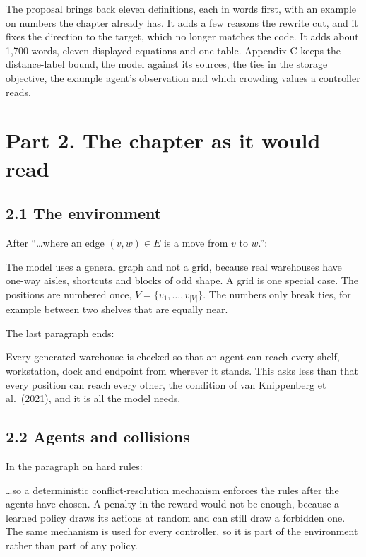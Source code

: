 \documentclass[11pt,a4paper]{article}
\newcommand{\new}[1]{\textcolor{newc}{#1}}
\newenvironment{greenblock}{\color{newc}}{}
\begin{document}
The proposal brings back eleven definitions, each in words first, with an
example on numbers the chapter already has. It adds a few reasons the
rewrite cut, and it fixes the direction to the target, which no longer
matches the code. It adds about 1{,}700 words, eleven displayed equations and
one table. Appendix C keeps the distance-label bound, the model against its
sources, the ties in the storage objective, the example agent's observation
and which crowding values a controller reads.

\section*{Part 2. The chapter as it would read}

\subsection*{2.1 The environment}

After ``\dots where an edge $(v,w)\in E$ is a move from $v$ to $w$.'':

\begin{greenblock}
The model uses a general graph and not a grid, because real warehouses have
one-way aisles, shortcuts and blocks of odd shape. A grid is one special
case. The positions are numbered once, $V=\{v_1,\dots,v_{|V|}\}$. The numbers
only break ties, for example between two shelves that are equally near.
\end{greenblock}

The last paragraph ends:

Every generated warehouse is checked so that an agent can reach every shelf,
workstation, dock and endpoint from wherever it stands. \new{This asks less
than that every position can reach every other, the condition of van
Knippenberg et al.\ (2021), and it is all the model needs.}

\subsection*{2.2 Agents and collisions}

In the paragraph on hard rules:

\dots so a deterministic conflict-resolution mechanism enforces the rules
after the agents have chosen. \new{A penalty in the reward would not be
enough, because a learned policy draws its actions at random and can still
draw a forbidden one.} The same mechanism is used for every controller, so
it is part of the environment rather than part of any policy.
\end{document}
